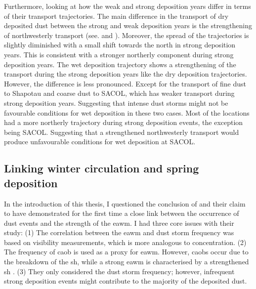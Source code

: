 Furthermore, looking at how the weak and strong deposition years differ in terms of their transport trajectories. 
The main difference in the  transport of dry deposited  dust between the strong and weak deposition years is the strengthening of northwesterly transport (see.  and ).
Moreover, the spread of the trajectories is slightly diminished with a small shift towards the north in strong deposition years. This is consistent with a stronger northerly component during strong deposition years. 
The wet deposition trajectory shows a strengthening of the transport during the strong deposition years like the dry deposition trajectories. 
However, the difference is less pronounced. 
Except for the transport of fine dust to Shapotau and coarse dust to SACOL, which has weaker transport during strong deposition years. 
Suggesting that intense dust storms might not be favourable conditions for wet deposition in these two cases.
Most of the locations had a more northerly trajectory during strong deposition events, the exception being SACOL. Suggesting that a strengthened northwesterly transport would produce unfavourable conditions for wet deposition at SACOL. 

   
\subsection{Linking winter circulation and spring deposition}
In the introduction of this thesis, I questioned the conclusion of \textcite{wyrwoll2016cold} and their claim to have demonstrated for the first time a close link between the occurrence of dust events and the strength of the \acrshort{eawm}. 
I had three core issues with their study: (1) The correlation between the \acrshort{eawm} and dust storm frequency was based on visibility measurements, which is more analogous to concentration.
(2) The frequency of \acrfull{caob} is used as a proxy for \acrshort{eawm}. However, \acrshort{caob}s occur due to the breakdown of the \acrfull{sh}, while a strong \acrshort{eawm} is characterised by a strengthened \acrshort{sh} \parencite{roe2009interpretation}. (3) They only considered the dust storm frequency; however, infrequent strong deposition events might contribute to the majority of the deposited dust. 

